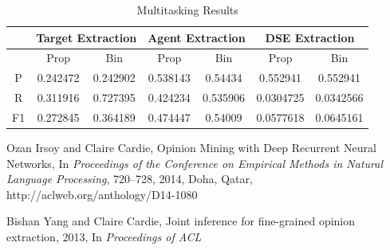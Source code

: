 \documentclass[fontsize=11pt, %
                             paper=a4, %
                             twoside, %
                             captions=tableheading,
                             index=totoc,
                             hyperref]{labbook}
\begin{document}
\begin{addmargin}[4cm]{0cm}
\begin{table}
\label{tab:original_results}
\raggedleft
\begin{tabular}{c|c|c|c|c|c|c}
\toprule
&\multicolumn{2}{|c|}{Target Extraction} & \multicolumn{2}{|c|}{Agent Extraction} & \multicolumn{2}{|c|}{DSE Extraction} \\
\hline
& Prop     & Bin     & Prop     & Bin & Prop & Bin\\
\hline
P & 0.242472 &0.242902 & 0.538143 & 0.54434 &  0.552941  & 0.552941\\
R & 0.311916 &0.727395 & 0.424234 & 0.535906 & 0.0304725 & 0.0342566\\
F1& 0.272845 &0.364189 & 0.474447 & 0.54009 & 0.0577618 & 0.0645161 \\
\bottomrule
\end{tabular}
\caption{Multitasking Results}
\end{table}

\end{addmargin}


\begin{thebibliography}{9}


Ozan Irsoy and Claire Cardie,
Opinion Mining with Deep Recurrent Neural Networks,
In \emph{Proceedings of the Conference on Empirical Methods in Natural Language Processing},
720--728,
2014,
Doha, Qatar,
http://aclweb.org/anthology/D14-1080

Bishan Yang and Claire Cardie,
Joint inference for fine-grained opinion extraction,
2013,
In \emph{Proceedings of ACL}

\end{thebibliography}

\end{document}
